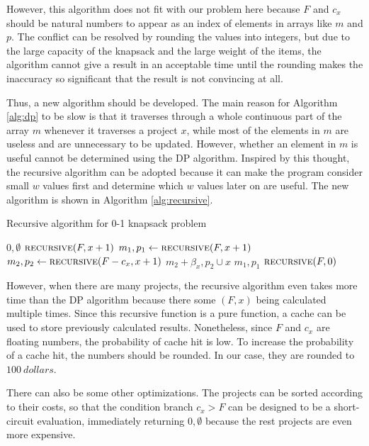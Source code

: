 \documentclass{article}
\begin{document}
However, this algorithm does not fit with our problem here
because $F$ and $c_x$ should be natural numbers to appear as an index of elements in arrays like $m$ and $p$.
The conflict can be resolved by rounding the values into integers,
but due to the large capacity of the knapsack and the large weight of the items,
the algorithm cannot give a result in an acceptable time until the rounding makes the inaccuracy so significant that the result is not convincing at all.

Thus, a new algorithm should be developed.
The main reason for Algorithm \ref{alg:dp} to be slow is that it traverses through a whole continuous part of the array $m$ whenever it traverses a project $x$,
while most of the elements in $m$ are useless and are unnecessary to be updated.
However, whether an element in $m$ is useful cannot be determined using the DP algorithm.
Inspired by this thought, the recursive algorithm can be adopted because it can make the program consider small $w$ values first and determine which $w$ values later on are useful.
The new algorithm is shown in Algorithm \ref{alg:recursive}.

\begin{algorithm}[h!]
\caption{Recursive algorithm for 0-1 knapsack problem}
\label{alg:recursive}
\begin{algorithmic}
	\State\Return$0,\emptyset$
	\State\Return$\Call{recursive}{F,x+1}$
\Else
	\State$m_1,p_1\leftarrow\Call{recursive}{F,x+1}$
	\State$m_2,p_2\leftarrow\Call{recursive}{F-c_x,x+1}$
		\State\Return$m_2+\beta_x,p_2\cup x$
	\Else
		\State\Return$m_1,p_1$
	\EndIf
\EndIf
\EndFunction
{}
\State\Return$\Call{recursive}{F,0}$
\EndFunction
\end{algorithmic}
\end{algorithm}

However, when there are many projects, the recursive algorithm even takes more time than the DP algorithm
because there some $\left(F,x\right)$ being calculated multiple times.
Since this recursive function is a pure function, a cache can be used to store previously calculated results.
Nonetheless, since $F$ and $c_x$ are floating numbers, the probability of cache hit is low.
To increase the probability of a cache hit, the numbers should be rounded.
In our case, they are rounded to $\SI{100}{dollars}$.

There can also be some other optimizations.
The projects can be sorted according to their costs, so that the condition branch $c_x>F$ can be designed to be a short-circuit evaluation,
immediately returning $0,\emptyset$ because the rest projects are even more expensive.
\end{document}
